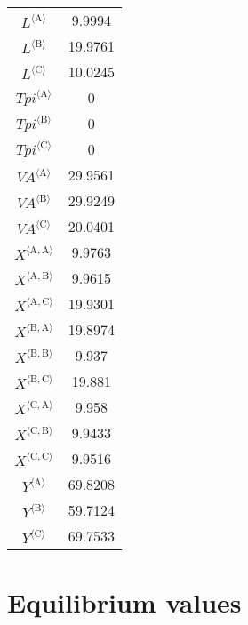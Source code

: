 \begin{tabular}{c|c|}
${L}^{\langle \mathrm{A}\rangle}$ & 9.9994 \\
${L}^{\langle \mathrm{B}\rangle}$ & 19.9761 \\
${L}^{\langle \mathrm{C}\rangle}$ & 10.0245 \\
${{T\!p\!i}}^{\langle \mathrm{A}\rangle}$ & 0 \\
${{T\!p\!i}}^{\langle \mathrm{B}\rangle}$ & 0 \\
${{T\!p\!i}}^{\langle \mathrm{C}\rangle}$ & 0 \\
${{V\!A}}^{\langle \mathrm{A}\rangle}$ & 29.9561 \\
${{V\!A}}^{\langle \mathrm{B}\rangle}$ & 29.9249 \\
${{V\!A}}^{\langle \mathrm{C}\rangle}$ & 20.0401 \\
${X}^{\langle \mathrm{A},\mathrm{A}\rangle}$ & 9.9763 \\
${X}^{\langle \mathrm{A},\mathrm{B}\rangle}$ & 9.9615 \\
${X}^{\langle \mathrm{A},\mathrm{C}\rangle}$ & 19.9301 \\
${X}^{\langle \mathrm{B},\mathrm{A}\rangle}$ & 19.8974 \\
${X}^{\langle \mathrm{B},\mathrm{B}\rangle}$ & 9.937 \\
${X}^{\langle \mathrm{B},\mathrm{C}\rangle}$ & 19.881 \\
${X}^{\langle \mathrm{C},\mathrm{A}\rangle}$ & 9.958 \\
${X}^{\langle \mathrm{C},\mathrm{B}\rangle}$ & 9.9433 \\
${X}^{\langle \mathrm{C},\mathrm{C}\rangle}$ & 9.9516 \\
${Y}^{\langle \mathrm{A}\rangle}$ & 69.8208 \\
${Y}^{\langle \mathrm{B}\rangle}$ & 59.7124 \\
${Y}^{\langle \mathrm{C}\rangle}$ & 69.7533 \\
\hline
\end{tabular}


\section{Equilibrium values}


